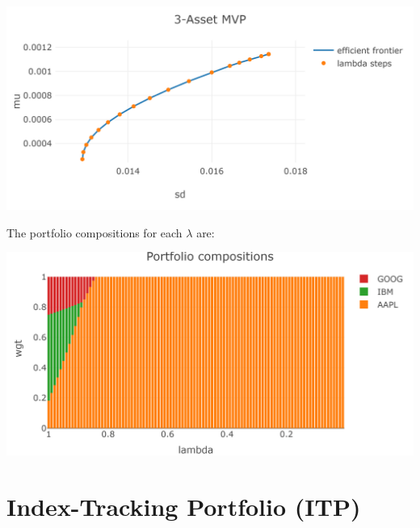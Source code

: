 \documentclass[
  oneside]{book}
\begin{document}
\includegraphics{Master_Thesis_files/figure-latex/MVP_ex5-1.png}

The portfolio compositions for each \(\lambda\) are:

\includegraphics{Master_Thesis_files/figure-latex/MVP_ex6-1.png}

\hypertarget{index-tracking-portfolio-itp}{%
\section{Index-Tracking Portfolio (ITP)}\label{index-tracking-portfolio-itp}}
\end{document}
